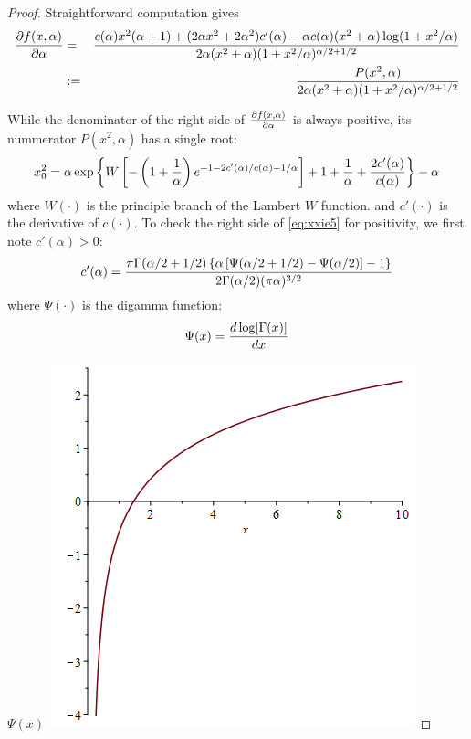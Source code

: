 \documentclass[11pt,a4]{amsart}
\newcommand{\pd}{\partial}
\newcommand{\1}{{\mathbf 1}}
\begin{document}
\begin{proof}
  Straightforward computation gives
  \begin{eqnarray}
    {\pd f(x, \alpha) \over \pd \alpha} &=& {
      c(\alpha) x^2 (\alpha + 1) + (2 \alpha x^2 + 2 \alpha^2) c'(\alpha)
      -
      \alpha c(\alpha) (x^2 + \alpha) \log(1 + x^2/\alpha)
      \over
      2 \alpha (x^2 + \alpha) (1 + x^2 / \alpha)^{\alpha/2 + 1/2}
    } \nonumber \\
    &:=& {
      P(x^2, \alpha)
      \over
      2 \alpha (x^2 + \alpha) (1 + x^2 / \alpha)^{\alpha/2 + 1/2}
    }
    \label{eq:xxie4.1}
  \end{eqnarray}

  While the denominator of the right side of ${\pd f(x, \alpha) \over \pd \alpha}$ is
  always positive, its nummerator $P(x^2, \alpha)$ has a single root:
  \begin{equation}
    \label{eq:xxie5}
    x_0^2 = \alpha\exp\left\{
      W\left[
        -\left(1 + {1 \over \alpha}\right)
        e^{-1 - 2 c'(\alpha)/c(\alpha) - 1/\alpha}
      \right]
      + 1 + {1 \over \alpha} + {2 c'(\alpha) \over c(\alpha)}
    \right\} - \alpha
  \end{equation}
  where $W(\cdot)$ is the principle branch of the Lambert $W$
  function. and $c'(\cdot)$ is the derivative of $c(\cdot)$. To check
  the right side of \eqref{eq:xxie5} for positivity, we first note
  $c'(\alpha) > 0$:
  \[
  c'(\alpha) = {
    \pi \Gamma(\alpha/2 + 1/2) \left\{
      \alpha \left[ \Psi(\alpha/2 + 1/2) - \Psi(\alpha/2)\right] - 1
    \right\}
    \over
    2 \Gamma(\alpha/2) (\pi \alpha)^{3/2}
  }
  \]
  where $\Psi(\cdot)$ is the digamma function:
  \[
  \Psi(x) = {d \log[\Gamma(x)] \over d x}
  \]
  \begin{minipage}{0.48\textwidth}
    $\Psi(x)$ \linebreak
    \includegraphics[width=\textwidth]{digamma.png}

\end{minipage}
\end{proof}
\end{document}

